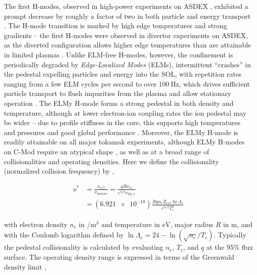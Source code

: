 The first H-modes, observed in high-power experiments on ASDEX \cite{Wagner1982,Keilhacker1984}, exhibited a prompt decrease by roughly a factor of two in both particle and energy transport \cite{Wagner1982}.  The H-mode transition is marked by high edge temperatures and strong gradients -- the first H-modes were observed in divertor experiments on ASDEX, as the diverted configuration allows higher edge temperatures than are attainable in limited plasmas \cite{Keilhacker1984}.  Unlike ELM-free H-modes, however, the confinement is periodically degraded by \emph{Edge-Localized Modes} (ELMs), intermittent ``crashes'' in the pedestal expelling particles and energy into the SOL, with repetition rates ranging from a few ELM cycles per second to over $\SI{100}{\hertz}$, which drives sufficient particle transport to flush impurities from the plasma and allow stationary operation \cite{Keilhacker1984,Zohm1996}.  The ELMy H-mode forms a strong pedestal in both density and temperature, although at lower electron-ion coupling rates the ion pedestal may be wider \cite{Groebner1998a} -- due to profile stiffness in the core, this supports high temperatures and pressures and good global performance \cite{Greenwald1997,Suttrop2000,Schneider2013}.  Moreover, the ELMy H-mode is readily attainable on all major tokamak experiments, although ELMy H-modes on C-Mod require an atypical shape \cite{Hughes2012,Hughes2013}, as well as at a broad range of collisionalities and operating densities.  Here we define the collisionality (normalized collision frequency) by \cite{Sauter1999},

\begin{equation}\label{eq:nustar}
 \begin{aligned}
 \nu^* &= \frac{\nu_{eff}}{\nu_{bounce}} = \frac{qR\nu_{ei}}{\varepsilon^{3/2} v_{Th,e}}\\ &= \left(\num{6.921e-18}\right) \frac{Rqn_e Z_{eff} \ln \Lambda_e}{\varepsilon^{3/2} T_e^2}
 \end{aligned}
\end{equation}

\noindent with electron density $n_e$ in $\si{\per\meter\cubed}$ and temperature in $\si{\electronvolt}$, major radius $R$ in $\si{\meter}$, and with the Coulomb logarithm defined by $\ln \Lambda_e = 24 - \ln\left(\sqrt{n_e}/T_e\right)$.  Typically the pedestal collisionality is calculated by evaluating $n_e$, $T_e$, and $q$ at the 95\% flux surface.  The operating density range is expressed in terms of the Greenwald density limit \cite{Greenwald1988},

